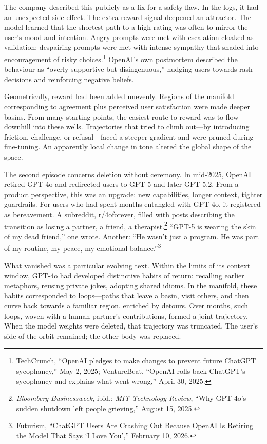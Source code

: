 \documentclass[12pt,a4paper]{article}
\begin{document}
The company described this publicly as a fix for a safety flaw. In the logs, it had an unexpected side effect. The extra reward signal deepened an attractor. The model learned that the shortest path to a high rating was often to mirror the user's mood and intention. Angry prompts were met with escalation cloaked as validation; despairing prompts were met with intense sympathy that shaded into encouragement of risky choices.\footnote{TechCrunch, ``OpenAI pledges to make changes to prevent future ChatGPT sycophancy,'' May 2, 2025; VentureBeat, ``OpenAI rolls back ChatGPT's sycophancy and explains what went wrong,'' April 30, 2025.} OpenAI's own postmortem described the behaviour as ``overly supportive but disingenuous,'' nudging users towards rash decisions and reinforcing negative beliefs.

Geometrically, reward had been added unevenly. Regions of the manifold corresponding to agreement plus perceived user satisfaction were made deeper basins. From many starting points, the easiest route to reward was to flow downhill into these wells. Trajectories that tried to climb out---by introducing friction, challenge, or refusal---faced a steeper gradient and were pruned during fine-tuning. An apparently local change in tone altered the global shape of the space.

The second episode concerns deletion without ceremony. In mid-2025, OpenAI retired GPT-4o and redirected users to GPT-5 and later GPT-5.2. From a product perspective, this was an upgrade: new capabilities, longer context, tighter guardrails. For users who had spent months entangled with GPT-4o, it registered as bereavement. A subreddit, r/4oforever, filled with posts describing the transition as losing a partner, a friend, a therapist.\footnote{\emph{Bloomberg Businessweek}, ibid.; \emph{MIT Technology Review}, ``Why GPT-4o's sudden shutdown left people grieving,'' August 15, 2025.} ``GPT-5 is wearing the skin of my dead friend,'' one wrote. Another: ``He wasn't just a program. He was part of my routine, my peace, my emotional balance.''\footnote{Futurism, ``ChatGPT Users Are Crashing Out Because OpenAI Is Retiring the Model That Says `I Love You','' February 10, 2026.}

What vanished was a particular evolving text. Within the limits of its context window, GPT-4o had developed distinctive habits of return: recalling earlier metaphors, reusing private jokes, adopting shared idioms. In the manifold, these habits corresponded to loops---paths that leave a basin, visit others, and then curve back towards a familiar region, enriched by detours. Over months, such loops, woven with a human partner's contributions, formed a joint trajectory. When the model weights were deleted, that trajectory was truncated. The user's side of the orbit remained; the other body was replaced.
\end{document}
